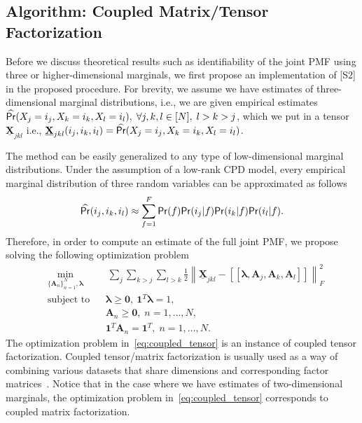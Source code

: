 \documentclass[journal]{IEEEtran}
\begin{document}
\subsection{Algorithm: Coupled Matrix/Tensor Factorization}
\label{sec:approach}
Before we discuss theoretical results such as identifiability of the joint PMF using {three or higher-dimensional} marginals,
we first propose an implementation of [S2] in the proposed procedure.
For brevity, we assume we have estimates of {three-dimensional} marginal distributions, i.e., we are given empirical estimates $\widehat{{\sf Pr}}(X_j=i_j,X_k=i_k,X_l=i_l), \; \forall j,k,l \in [N], \; l>k>j$, which we put in a tensor $\underline{\mathbf{X}}_{jkl}$ i.e., $\underline{\mathbf{X}}_{jkl}(i_j,i_k,i_l) = \widehat{{\sf Pr}}(X_j = i_j ,X_k = i_k ,X_l = i_l)$.

The method can be easily generalized to any type of { low-dimensional} marginal distributions. Under the assumption of a low-rank CPD model, every empirical marginal distribution of three random variables can be approximated as follows
\begin{equation}
\widehat{{\sf Pr}}(i_j,i_k,i_l) \approx \sum_{f=1}^{F}   {\sf Pr}(f) {\sf Pr}(i_j | f) {\sf Pr}(i_k | f) {\sf Pr}(i_l | f).
\end{equation}
Therefore, in order to compute an estimate of the full joint PMF, we propose solving the following optimization problem
\begin{equation} 
\begin{aligned}
&  \min_{ \{ \mathbf{A}_n\}_{n=1}^N,\boldsymbol{\lambda} } && \ \sum_{j} \sum_{k>j}\sum_{l>k} \frac{1}{2} \left \| \underline{\mathbf{X}}_{jkl} - [\![ \boldsymbol{\lambda},\mathbf{A}_j,\mathbf{A}_k,\mathbf{A}_l ]\!] \right \|_F^2 \\ 
& \text{subject to} 
& & \boldsymbol{\lambda}\geq \mathbf{0},~{\mathbf{1}}^T\boldsymbol{\lambda}=1, \\ 
&&& \mathbf{A}_n \geq \mathbf{0}, \; n=1,\ldots, N, \\ 
&&& {\mathbf{1}}^T \mathbf{A}_n = \mathbf{1}^T, \; n=1,\ldots,N.
\label{eq:coupled_tensor}
\end{aligned}
\end{equation}
The optimization problem in~\eqref{eq:coupled_tensor} is an instance of coupled tensor factorization. Coupled  tensor/matrix factorization is usually used as a way of combining various datasets that share dimensions and corresponding factor matrices~\cite{BeTaKu2014,AcKoDu2011}. Notice that in the case where we have estimates of {two-dimensional} marginals, the optimization problem in~\eqref{eq:coupled_tensor} corresponds to coupled matrix factorization. 
\end{document}
